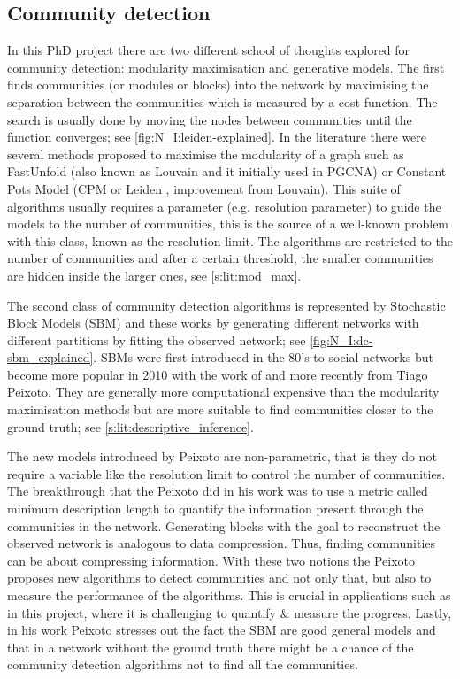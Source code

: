 \subsection{Community detection} \label{s:lit:comm_detect}

In this PhD project there are two different school of thoughts explored for community detection: modularity maximisation and generative models. The first finds communities (or modules or blocks) into the network by maximising the separation between the communities which is measured by a cost function. The search is usually done by moving the nodes between communities until the function converges; see \cref{fig:N_I:leiden-explained}. In the literature there were several methods proposed to maximise the modularity of a graph such as FastUnfold \citet{Blondel2008-ik} (also known as Louvain and it initially used in PGCNA) or Constant Pots Model (CPM or Leiden \citet{Traag2019-ne}, improvement from Louvain). This suite of algorithms usually requires a parameter (e.g. resolution parameter) to guide the models to the number of communities, this is the source of a well-known problem with this class, known as the resolution-limit. The algorithms are restricted to the number of communities and after a certain threshold, the smaller communities are hidden inside the larger ones, see \cref{s:lit:mod_max}.

The second class of community detection algorithms is represented by Stochastic Block Models (SBM) and these works by generating different networks with different partitions by fitting the observed network; see \cref{fig:N_I:dc-sbm_explained}. SBMs were first introduced in the 80's to social networks \citet{Holland1983-eu} but become more popular in 2010 with the work of \citet{Karrer2011-si} and more recently from Tiago Peixoto. They are generally more computational expensive than the modularity maximisation methods but are more suitable to find communities closer to the ground truth; see \cref{s:lit:descriptive_inference}.

The new models introduced by Peixoto are non-parametric, that is they do not require a variable like the resolution limit to control the number of communities. The breakthrough that the Peixoto did in his work was to use a metric called minimum description length to quantify the information present through the communities in the network. Generating blocks with the goal to reconstruct the observed network is analogous to data compression. Thus, finding communities can be about compressing information. With these two notions the Peixoto proposes new algorithms to detect communities and not only that, but also to measure the performance of the algorithms. This is crucial in applications such as in this project, where it is challenging to quantify \& measure the progress. Lastly, in his work Peixoto stresses out the fact the SBM are good general models and that in a network without the ground truth there might be a chance of the community detection algorithms not to find all the communities.

